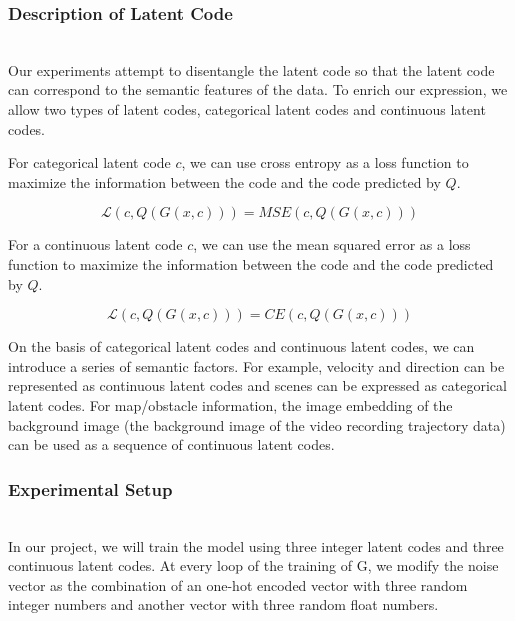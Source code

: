 \subsubsection{Description of Latent Code}

\hfill \\
Our experiments attempt to disentangle the latent code so that the latent code can correspond to the semantic features of the data. To enrich our expression, we allow two types of latent codes, categorical latent codes and continuous latent codes.

For categorical latent code $c$, we can use cross entropy as a loss function to maximize the information between the code and the code predicted by $Q$.


$$\mathcal{L} (c, Q(G(x, c))) = MSE(c, Q(G(x, c))) $$

For a continuous latent code $c$, we can use the mean squared error as a loss function to maximize the information between the code and the code predicted by $Q$.

$$\mathcal{L} (c, Q(G(x, c))) = CE(c, Q(G(x, c))) $$

On the basis of categorical latent codes and continuous latent codes, we can introduce a series of semantic factors. For example, velocity and direction can be represented as continuous latent codes and scenes can be expressed as categorical latent codes. For map/obstacle information, the image embedding of the background image (the background image of the video recording trajectory data) can be used as a sequence of continuous latent codes.

\subsubsection{Experimental Setup}

\hfill \\
In our project, we will train the model using three integer latent codes and three continuous latent codes. At every loop of the training of G, we modify the noise vector as the combination of an one-hot encoded vector with three random integer numbers and another vector with three random float numbers.

